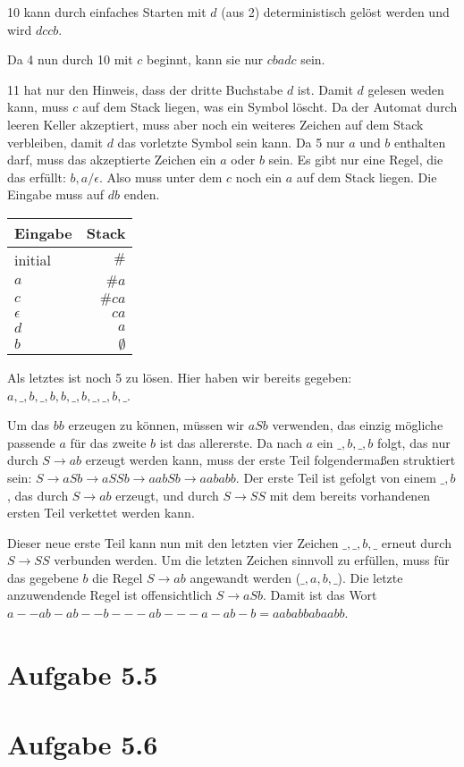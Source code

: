 \documentclass{article}
\begin{document}
\bigskip

10 kann durch einfaches Starten mit $d$ (aus 2) deterministisch gelöst werden und wird $dccb$.

\bigskip

Da 4 nun durch 10 mit $c$ beginnt, kann sie nur $cbadc$ sein.

\bigskip

11 hat nur den Hinweis, dass der dritte Buchstabe $d$ ist. Damit $d$ gelesen weden kann, muss $c$ auf dem Stack liegen, was ein Symbol löscht. Da der Automat durch leeren Keller akzeptiert, muss aber noch ein weiteres Zeichen auf dem Stack verbleiben, damit $d$ das vorletzte Symbol sein kann. Da 5 nur $a$ und $b$ enthalten darf, muss das akzeptierte Zeichen ein $a$ oder $b$ sein. Es gibt nur eine Regel, die das erfüllt: $b,a/\epsilon$. Also muss unter dem $c$ noch ein $a$ auf dem Stack liegen. Die Eingabe muss auf $db$ enden.

\begin{table*}[h]
	\centering
		\begin{tabular}{l|r}
      Eingabe & Stack \\
      \hline
      initial & $\#$ \\
      $a$ & $\# a$ \\
      $c$ & $\# ca$ \\
      $\epsilon$ & $ca$ \\
      $d$ & $a$ \\
      $b$ & $\emptyset$
		\end{tabular}
\end{table*}

\bigskip

Als letztes ist noch 5 zu lösen. Hier haben wir bereits gegeben: \\ $a,\_,b,\_,b,b,\_,b,\_,\_,b,\_$. 

Um das $bb$ erzeugen zu können, müssen wir $aSb$ verwenden, das einzig mögliche passende $a$ für das zweite $b$ ist das allererste. Da nach $a$ ein $\_,b,\_,b$ folgt, das nur durch $S\rightarrow ab$ erzeugt werden kann, muss der erste Teil folgendermaßen struktiert sein: $S \rightarrow aSb \rightarrow aSSb \rightarrow aabSb \rightarrow aababb$.
Der erste Teil ist gefolgt von einem $\_,b$, das durch $S \rightarrow ab$ erzeugt, und durch $S \rightarrow SS$ mit dem bereits vorhandenen ersten Teil verkettet werden kann.

Dieser neue erste Teil kann nun mit den letzten vier Zeichen $\_,\_,b,\_$ erneut durch $S \rightarrow SS$ verbunden werden. Um die letzten Zeichen sinnvoll zu erfüllen, muss für das gegebene $b$ die Regel $S \rightarrow ab$ angewandt werden ($\_,a,b,\_$). Die letzte anzuwendende Regel ist offensichtlich $S \rightarrow aSb$. Damit ist das Wort \linebreak $a--ab-ab--b---ab---a-ab-b = aababbabaabb$.


\section*{Aufgabe 5.5}



\section*{Aufgabe 5.6}
\end{document}

